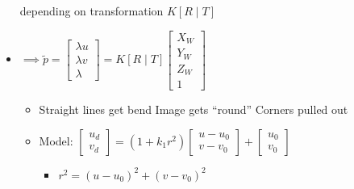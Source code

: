 \begin{itemize}
     depending on transformation
     $K[R \mid T]$
    \item $\implies \tilde p =
        \begin{bmatrix}
            \lambda u\\
            \lambda v\\
            \lambda
        \end{bmatrix} = K[R \mid T]
        \begin{bmatrix}
            X_W\\
            Y_W\\
            Z_W\\
            1
        \end{bmatrix}$
        \begin{itemize}
            \item Straight lines get bend
             Image gets ``round''
             Corners pulled out
            \item Model:
                $\begin{bmatrix}
                    u_d\\
                    v_d
                \end{bmatrix} = (1 + k_1 r^2)
                \begin{bmatrix}
                    u - u_0\\
                    v - v_0
                \end{bmatrix} +
                \begin{bmatrix}
                    u_0\\
                    v_0
                \end{bmatrix}$
                \begin{itemize}
                     Intrinsic parameter
                    \item $r^2 = (u - u_0)^2 + (v - v_0)^2$
                \end{itemize}
        \end{itemize}
\end{itemize}

